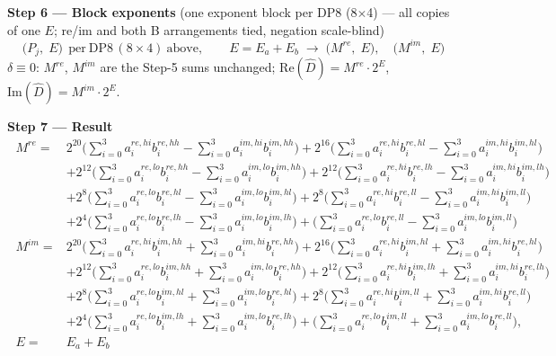 \documentclass[fleqn]{article}
\newcommand{\DPop}[3]{\mathrm{DP#1}\,(#2\!\times\!#3)}
\begin{document}
\vspace{0.3em}

\noindent\textbf{Step 6 --- Block exponents}\quad
{\small(one exponent block per DP8 (8$\times$4) --- all copies of one $E$; re/im and both B arrangements tied, negation scale-blind)}
\[
\big(P_j,\; E\big)\ \ \text{per}\ \DPop{8}{8}{4}\ \text{above}, \qquad E = E_a + E_b
\;\longrightarrow\;
\big(M^{re},\; E\big), \quad \big(M^{im},\; E\big)
\]
$\delta\equiv0$: $M^{re}$, $M^{im}$ are the Step-5 sums unchanged; \quad $\mathrm{Re}(\hat D)=M^{re}\cdot2^{E}$, \ $\mathrm{Im}(\hat D)=M^{im}\cdot2^{E}$.

\vspace{0.3em}

\noindent\textbf{Step 7 --- Result}
{\small
\[
\boxed{\;
\begin{aligned}
M^{re} ={}& 2^{20}\Big(\!\sum_{i=0}^{3} a_i^{re,hi} b_i^{re,hh} - \!\sum_{i=0}^{3} a_i^{im,hi} b_i^{im,hh}\Big)
  + 2^{16}\Big(\!\sum_{i=0}^{3} a_i^{re,hi} b_i^{re,hl} - \!\sum_{i=0}^{3} a_i^{im,hi} b_i^{im,hl}\Big) \\
  & + 2^{12}\Big(\!\sum_{i=0}^{3} a_i^{re,lo} b_i^{re,hh} - \!\sum_{i=0}^{3} a_i^{im,lo} b_i^{im,hh}\Big)
  + 2^{12}\Big(\!\sum_{i=0}^{3} a_i^{re,hi} b_i^{re,lh} - \!\sum_{i=0}^{3} a_i^{im,hi} b_i^{im,lh}\Big) \\
  & + 2^{8}\Big(\!\sum_{i=0}^{3} a_i^{re,lo} b_i^{re,hl} - \!\sum_{i=0}^{3} a_i^{im,lo} b_i^{im,hl}\Big)
  + 2^{8}\Big(\!\sum_{i=0}^{3} a_i^{re,hi} b_i^{re,ll} - \!\sum_{i=0}^{3} a_i^{im,hi} b_i^{im,ll}\Big) \\
  & + 2^{4}\Big(\!\sum_{i=0}^{3} a_i^{re,lo} b_i^{re,lh} - \!\sum_{i=0}^{3} a_i^{im,lo} b_i^{im,lh}\Big)
  + \Big(\!\sum_{i=0}^{3} a_i^{re,lo} b_i^{re,ll} - \!\sum_{i=0}^{3} a_i^{im,lo} b_i^{im,ll}\Big) \\[0.4em]
M^{im} ={}& 2^{20}\Big(\!\sum_{i=0}^{3} a_i^{re,hi} b_i^{im,hh} + \!\sum_{i=0}^{3} a_i^{im,hi} b_i^{re,hh}\Big)
  + 2^{16}\Big(\!\sum_{i=0}^{3} a_i^{re,hi} b_i^{im,hl} + \!\sum_{i=0}^{3} a_i^{im,hi} b_i^{re,hl}\Big) \\
  & + 2^{12}\Big(\!\sum_{i=0}^{3} a_i^{re,lo} b_i^{im,hh} + \!\sum_{i=0}^{3} a_i^{im,lo} b_i^{re,hh}\Big)
  + 2^{12}\Big(\!\sum_{i=0}^{3} a_i^{re,hi} b_i^{im,lh} + \!\sum_{i=0}^{3} a_i^{im,hi} b_i^{re,lh}\Big) \\
  & + 2^{8}\Big(\!\sum_{i=0}^{3} a_i^{re,lo} b_i^{im,hl} + \!\sum_{i=0}^{3} a_i^{im,lo} b_i^{re,hl}\Big)
  + 2^{8}\Big(\!\sum_{i=0}^{3} a_i^{re,hi} b_i^{im,ll} + \!\sum_{i=0}^{3} a_i^{im,hi} b_i^{re,ll}\Big) \\
  & + 2^{4}\Big(\!\sum_{i=0}^{3} a_i^{re,lo} b_i^{im,lh} + \!\sum_{i=0}^{3} a_i^{im,lo} b_i^{re,lh}\Big)
  + \Big(\!\sum_{i=0}^{3} a_i^{re,lo} b_i^{im,ll} + \!\sum_{i=0}^{3} a_i^{im,lo} b_i^{re,ll}\Big), \\[0.4em]
E ={}& E_a + E_b
\end{aligned}
\;}
\]
}
\end{document}

